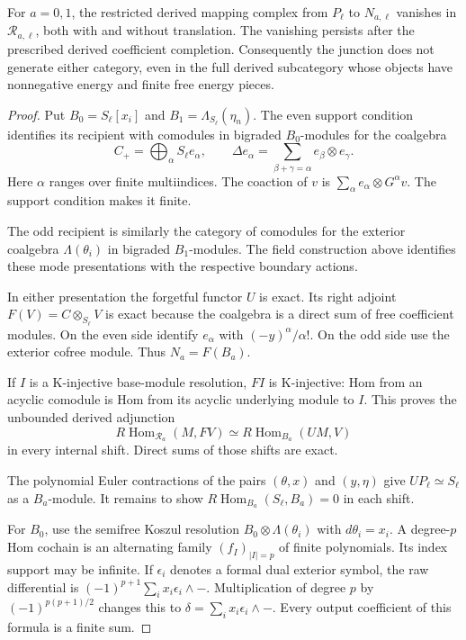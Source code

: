 \begin{theorem}\label{mht:thm:ramond-orthogonals}
For $a=0,1$, the restricted derived mapping complex from
$P_\ell$ to $N_{a,\ell}$ vanishes in $\mathcal R_{a,\ell}$,
both with and without translation. The vanishing persists
after the prescribed derived coefficient completion.
Consequently the junction does not generate either category,
even in the full derived subcategory whose objects have
nonnegative energy and finite free energy pieces.
\end{theorem}

\begin{proof}
Put $B_0=S_\ell[x_i]$ and $B_1=\Lambda_{S_\ell}(\eta_n)$.
The even support condition identifies its recipient with
comodules in bigraded $B_0$-modules for the coalgebra
\[
 C_+=\bigoplus_\alpha S_\ell e_\alpha,
 \qquad \Delta e_\alpha=\sum_{\beta+\gamma=\alpha}
                         e_\beta\otimes e_\gamma.
\]
Here $\alpha$ ranges over finite multiindices. The coaction
of $v$ is $\sum_\alpha e_\alpha\otimes G^\alpha v$.
The support condition makes it finite.

The odd recipient is
similarly the category of comodules for the exterior
coalgebra $\Lambda(\theta_i)$ in bigraded $B_1$-modules.
The field construction above identifies these mode
presentations with the respective boundary actions.

In either presentation the forgetful functor $U$ is exact.
Its right adjoint $F(V)=C\otimes_{S_\ell}V$ is exact because
the coalgebra is a direct sum of free coefficient modules.
On the even side identify $e_\alpha$ with
$(-y)^\alpha/\alpha!$. On the odd side use the exterior
cofree module. Thus $N_a=F(B_a)$.

If $I$ is a K-injective
base-module resolution, $FI$ is K-injective: Hom from an
acyclic comodule is Hom from its acyclic underlying module
to $I$. This proves the unbounded derived adjunction
\[
 R\operatorname{Hom}_{\mathcal R_a}(M,FV)
       \simeq R\operatorname{Hom}_{B_a}(UM,V)
\]
in every internal shift. Direct sums of those shifts are
exact.

The polynomial Euler contractions of the pairs
$(\theta,x)$ and $(y,\eta)$ give $UP_\ell\simeq S_\ell$
as a $B_a$-module. It remains to show
$R\operatorname{Hom}_{B_a}(S_\ell,B_a)=0$ in each shift.

For $B_0$, use the semifree Koszul resolution
$B_0\otimes\Lambda(\theta_i)$ with $d\theta_i=x_i$.
A degree-$p$ Hom cochain is an alternating family
$(f_I)_{|I|=p}$ of finite polynomials. Its index support may
be infinite. If $\epsilon_i$ denotes a formal dual exterior
symbol, the raw differential is
$(-1)^{p+1}\sum_i x_i\epsilon_i\wedge-$.
Multiplication of degree $p$ by $(-1)^{p(p+1)/2}$ changes
this to $\delta=\sum_i x_i\epsilon_i\wedge-$.
Every output coefficient of this formula is a finite sum.


\end{proof}
